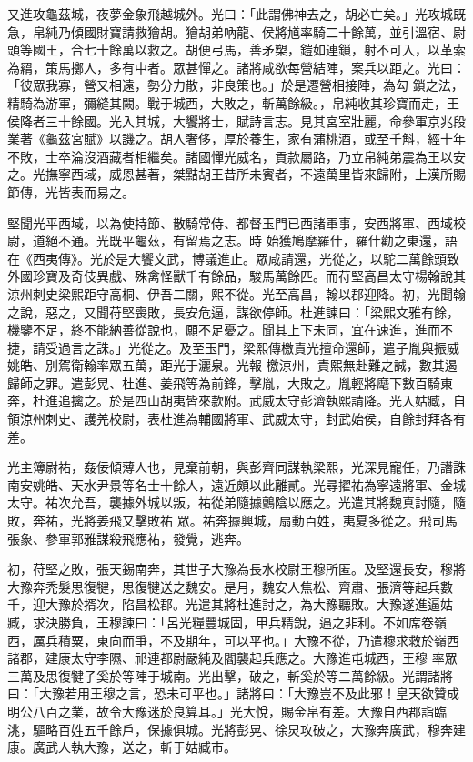 \begin{pinyinscope}
 又進攻龜茲城，夜夢金象飛越城外。光曰：「此謂佛神去之，胡必亡矣。」光攻城既急，帛純乃傾國財寶請救獪胡。獪胡弟吶龍、侯將馗率騎二十餘萬，並引溫宿、尉頭等國王，合七十餘萬以救之。胡便弓馬，善矛槊，鎧如連鎖，射不可入，以革索為羂，策馬擲人，多有中者。眾甚憚之。諸將咸欲每營結陣，案兵以距之。光曰：「彼眾我寡，營又相遠，勢分力散，非良策也。」於是遷營相接陣，為勾
 鎖之法，精騎為游軍，彌縫其闕。戰于城西，大敗之，斬萬餘級。，帛純收其珍寶而走，王侯降者三十餘國。光入其城，大饗將士，賦詩言志。見其宮室壯麗，命參軍京兆段業著《龜茲宮賦》以譏之。胡人奢侈，厚於養生，家有蒲桃酒，或至千斛，經十年不敗，士卒淪沒酒藏者相繼矣。諸國憚光威名，貢款屬路，乃立帛純弟震為王以安之。光撫寧西域，威恩甚著，桀黠胡王昔所未賓者，不遠萬里皆來歸附，上漢所賜節傳，光皆表而易之。



 堅聞光平西域，以為使持節、散騎常侍、都督玉門已西諸軍事，安西將軍、西域校尉，道絕不通。光既平龜茲，有留焉之志。時
 始獲鳩摩羅什，羅什勸之東還，語在《西夷傳》。光於是大饗文武，博議進止。眾咸請還，光從之，以駝二萬餘頭致外國珍寶及奇伎異戲、殊禽怪獸千有餘品，駿馬萬餘匹。而苻堅高昌太守楊翰說其涼州刺史梁熙距守高桐、伊吾二關，熙不從。光至高昌，翰以郡迎降。初，光聞翰之說，惡之，又聞苻堅喪敗，長安危逼，謀欲停師。杜進諫曰：「梁熙文雅有餘，機鑒不足，終不能納善從說也，願不足憂之。聞其上下未同，宜在速進，進而不捷，請受過言之誅。」光從之。及至玉門，梁熙傳檄責光擅命還師，遣子胤與振威姚皓、別駕衛翰率眾五萬，距光于灑泉。光報
 檄涼州，責熙無赴難之誠，數其遏歸師之罪。遣彭晃、杜進、姜飛等為前鋒，擊胤，大敗之。胤輕將麾下數百騎東奔，杜進追擒之。於是四山胡夷皆來款附。武威太守彭濟執熙請降。光入姑臧，自領涼州刺史、護羌校尉，表杜進為輔國將軍、武威太守，封武始侯，自餘封拜各有差。



 光主簿尉祐，姦佞傾薄人也，見棄前朝，與彭齊同謀執梁熙，光深見寵任，乃譖誅南安姚皓、天水尹景等名士十餘人，遠近頗以此離貳。光尋擢祐為寧遠將軍、金城太守。祐次允吾，襲據外城以叛，祐從弟隨據鸇陰以應之。光遣其將魏真討隨，隨敗，奔祐，光將姜飛又擊敗祐
 眾。祐奔據興城，扇動百姓，夷夏多從之。飛司馬張象、參軍郭雅謀殺飛應祐，發覺，逃奔。



 初，苻堅之敗，張天錫南奔，其世子大豫為長水校尉王穆所匿。及堅還長安，穆將大豫奔禿髮思復犍，思復犍送之魏安。是月，魏安人焦松、齊肅、張濟等起兵數千，迎大豫於揟次，陷昌松郡。光遣其將杜進討之，為大豫聽敗。大豫遂進逼姑臧，求決勝負，王穆諫曰：「呂光糧豐城固，甲兵精銳，逼之非利。不如席卷嶺西，厲兵積粟，東向而爭，不及期年，可以平也。」大豫不從，乃遣穆求救於嶺西諸郡，建康太守李隰、祁連都尉嚴純及閻襲起兵應之。大豫進屯城西，王穆
 率眾三萬及思復犍子奚於等陣于城南。光出擊，破之，斬奚於等二萬餘級。光謂諸將曰：「大豫若用王穆之言，恐未可平也。」諸將曰：「大豫豈不及此邪！皇天欲贊成明公八百之業，故令大豫迷於良算耳。」光大悅，賜金帛有差。大豫自西郡詣臨洮，驅略百姓五千餘戶，保據俱城。光將彭晃、徐炅攻破之，大豫奔廣武，穆奔建康。廣武人執大豫，送之，斬于姑臧市。




\end{pinyinscope}
